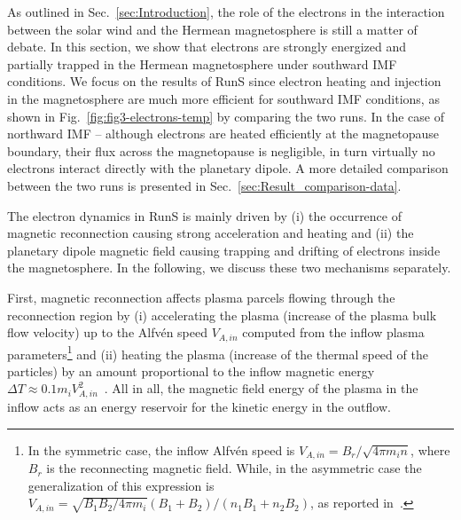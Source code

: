 \documentclass{aa}
\begin{document}
As outlined in Sec.~\ref{sec:Introduction}, the role of the electrons in the interaction between the solar wind and the Hermean magnetosphere is still a matter of debate. In this section, we show that electrons are strongly energized and partially trapped in the Hermean magnetosphere under southward IMF conditions.
We focus on the results of RunS since electron heating and injection in the magnetosphere are much more efficient for southward IMF conditions, as shown in Fig.~\ref{fig:fig3-electrons-temp} by comparing the two runs. In the case of northward IMF -- although electrons are heated efficiently at the magnetopause boundary, their flux across the magnetopause is negligible, in turn virtually no electrons interact directly with the planetary dipole. A more detailed comparison between the two runs is presented in Sec.~\ref{sec:Result_comparison-data}.

The electron dynamics in RunS is mainly driven by (i) the occurrence of magnetic reconnection causing strong acceleration and heating and (ii) the planetary dipole magnetic field causing trapping and drifting of electrons inside the magnetosphere. In the following, we discuss these two mechanisms separately. 

First, magnetic reconnection affects plasma parcels flowing through the reconnection region by (i) accelerating the plasma (increase of the plasma bulk flow velocity) up to the Alfv\'en speed $V_{A,in}$ computed from the inflow plasma parameters\footnote{In the symmetric case, the inflow Alfv\'en speed is $V_{A,in}=B_r/\sqrt{4\pi m_i n}$, where $B_r$ is the reconnecting magnetic field. While, in the asymmetric case the generalization of this expression is $V_{A,in}=\sqrt{B_1 B_2/4\pi m_i} (B_1+B_2)/(n_1B_1+n_2B_2)$, as reported in~\citet{Cassak2007}.} and (ii) heating the plasma (increase of the thermal speed of the particles) by an amount proportional to the inflow magnetic energy $\Delta T \approx 0.1 m_i V^2_{A,in}$~\citep{Phan2014,Shay2014,Haggerty2015}. All in all, the magnetic field energy of the plasma in the inflow acts as an energy reservoir for the kinetic energy in the outflow.
\end{document}
